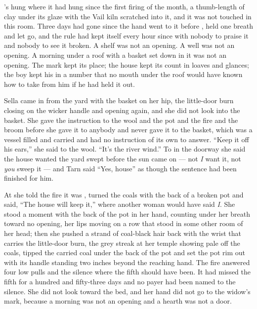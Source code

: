 's  hung where it had hung since the first firing of the month, a thumb-length of  clay under its glaze with the Vail kiln scratched into it, and it was not touched in this room. Three days had gone since the hand went to it before , held one breath and let go, and the rule had kept itself every hour since with nobody to praise it and nobody to see it broken. A shelf was not an opening. A well was not an opening. A morning under a roof with a basket set down in it was not an opening. The mark kept its place; the house kept its count in loaves and glances; the boy kept his in a number that no mouth under the roof would have known how to take from him if he had held it out.

\scenebreak

Sella came in from the yard with the basket on her hip, the little-door burn closing on the wicker handle and opening again, and she did not look into the basket. She gave the instruction to the wool and the pot and the fire and the broom before she gave it to anybody and never gave it to the basket, which was a vessel filled and carried and had no instruction of its own to answer. “Keep it off his ears,” she said to the wool. “It's the river wind.” To  in the doorway she said the house wanted the yard swept before the sun came on  --- not \emph{I} want it, not \emph{you} sweep it --- and Tarn said “Yes, house” as though the sentence had been finished for him.

At  she told the fire it was , turned the coals with the back of a broken pot and said, “The house will keep it,” where another woman would have said \emph{I}. She stood a moment with the back of the pot in her hand, counting under her breath toward no opening, her lips moving on a row that stood in some other room of her head; then she pushed a strand of coal-black hair back with the wrist that carries the little-door burn, the grey streak at her temple showing pale off the coals, tipped the carried coal under the back of the pot and set the pot rim out with its handle standing two inches beyond the reaching hand. The fire answered four low pulls and the silence where the fifth should have been. It had missed the fifth for a hundred and fifty-three days and no payer had been named to the silence. She did not look toward the bed, and her hand did not go to the widow's mark, because a morning was not an opening and a hearth was not a door.

